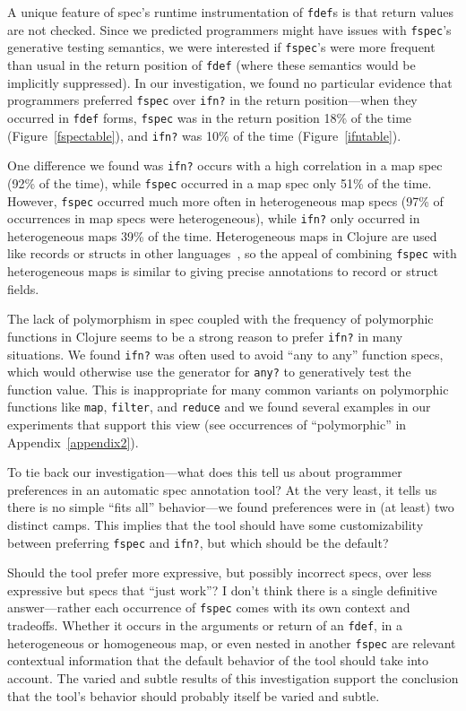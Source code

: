 A unique feature of spec's runtime instrumentation of \texttt{fdef}s is that
return values are not checked. Since we predicted programmers might have
issues with \texttt{fspec}'s generative testing semantics, we were interested
if \texttt{fspec}'s were more frequent than usual in the return position
of \texttt{fdef} (where these semantics would be implicitly suppressed).
In our investigation, we found no particular evidence that programmers preferred
\texttt{fspec} over \texttt{ifn?} in the return position---when they occurred in \texttt{fdef} forms,
\texttt{fspec} was in the return position 18\% of the time (Figure~\ref{fspectable}),
and \texttt{ifn?} was 10\% of the time (Figure~\ref{ifntable}).

One difference we found was \texttt{ifn?} occurs with a high correlation in
a map spec (92\% of the time), while \texttt{fspec} occurred in a map spec
only 51\% of the time.
However, \texttt{fspec} occurred much more often in heterogeneous map specs
(97\% of occurrences in map specs were heterogeneous), while \texttt{ifn?}
only occurred in heterogeneous maps 39\% of the time.
Heterogeneous maps in Clojure are used like records or structs in other
languages~\cite{bonnaire2016practical}, so the appeal of combining
\texttt{fspec} with heterogeneous maps is similar to giving precise annotations
to record or struct fields.

The lack of polymorphism in spec coupled with the frequency of polymorphic functions
in Clojure seems to be a strong reason to prefer \texttt{ifn?} in many situations.
We found \texttt{ifn?} was often used to avoid ``any to any'' function
specs, which would otherwise use the generator for \texttt{any?} to generatively test
the function value. This is inappropriate for many common variants on polymorphic functions like
\texttt{map}, \texttt{filter}, and \texttt{reduce}
and we found several examples in our experiments that support this view
(see occurrences of ``polymorphic'' in Appendix~\ref{appendix2}).


To tie back our investigation---what does this tell us about programmer preferences in an automatic spec annotation
tool? At the very least, it tells us there is no simple ``fits all'' behavior---we found
preferences were in (at least) two distinct camps.
This implies that the tool should have some customizability between preferring
\texttt{fspec} and \texttt{ifn?}, but which should be the default?

Should the tool prefer more expressive, but possibly incorrect specs, over less
expressive but specs that ``just work''?
I don't think there is a single definitive answer---rather each occurrence of \texttt{fspec}
comes with its own context and tradeoffs. Whether it occurs in the arguments or return of
an \texttt{fdef}, in a heterogeneous or homogeneous map, or even nested in another \texttt{fspec}
are relevant contextual information that the default behavior of the tool should take
into account. The varied and subtle results of this investigation support the conclusion
that the tool's behavior should probably itself be varied and subtle.
